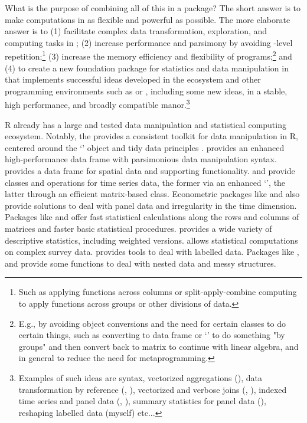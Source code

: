 \documentclass[article]{jss}
\newcommand{\class}[1]{`\code{#1}'}
\begin{document}
What is the purpose of combining all of this in a package? The short answer is to make computations in  as flexible and powerful as possible. The more elaborate answer is to (1) facilitate complex data transformation, exploration, and computing tasks in ; (2) increase performance and parsimony by avoiding -level repetition;\footnote{Such as applying  functions across columns or split-apply-combine computing to apply functions across groups or other divisions of data.} (3) increase the memory efficiency and flexibility of  programs;\footnote{E.g., by avoiding object conversions and the need for certain classes to do certain things, such as converting to data frame or \class{data.table} to do something "by groups" and then convert back to matrix to continue with linear algebra, and in general to reduce the need for metaprogramming.} and (4) to create a new foundation package for statistics and data manipulation in  that implements successful ideas developed in the  ecosystem and other programming environments such as  or  \citep{STATA}, including some new ideas, in a stable, high performance, and broadly compatible manor.\footnote{Examples of such ideas are  syntax, vectorized aggregations (), data transformation by reference (, ), vectorized and verbose joins (, ), indexed time series and panel data (, ), summary statistics for panel data (), reshaping labelled data (myself) etc...} \newline

R already has a large and tested data manipulation and statistical computing ecosystem. Notably, the  \citep{rtidyverse} provides a consistent toolkit for data manipulation in R, centered around the \class{tibble} \citep{rtibble} object and tidy data principles \citep{rtidydata}.  \citep{rdatatable} provides an enhanced high-performance data frame with parsimonious data manipulation syntax.  \citep{rsf} provides a data frame for spatial data and supporting functionality.  \citep{rtsibble} and  \citep{rxts} provide classes and operations for time series data, the former via an enhanced \class{tibble}, the latter through an efficient matrix-based class. Econometric packages like  \citep{rplm} and  \citep{rfixest} also provide solutions to deal with panel data and irregularity in the time dimension. Packages like  \citep{rmatrixstats} and  \citep{rfast} offer fast statistical calculations along the rows and columns of matrices and faster basic statistical procedures.  \citep{rdesctools} provides a wide variety of descriptive statistics, including weighted versions.  \citep{rsurvey} allows statistical computations on complex survey data.  \citep{rlabelled} provides tools to deal with labelled data. Packages like  \citep{rtidyr},  \citep{rpurrr} and  \citep{rrapply} provide some functions to deal with nested data and messy structures. \newline
\end{document}
